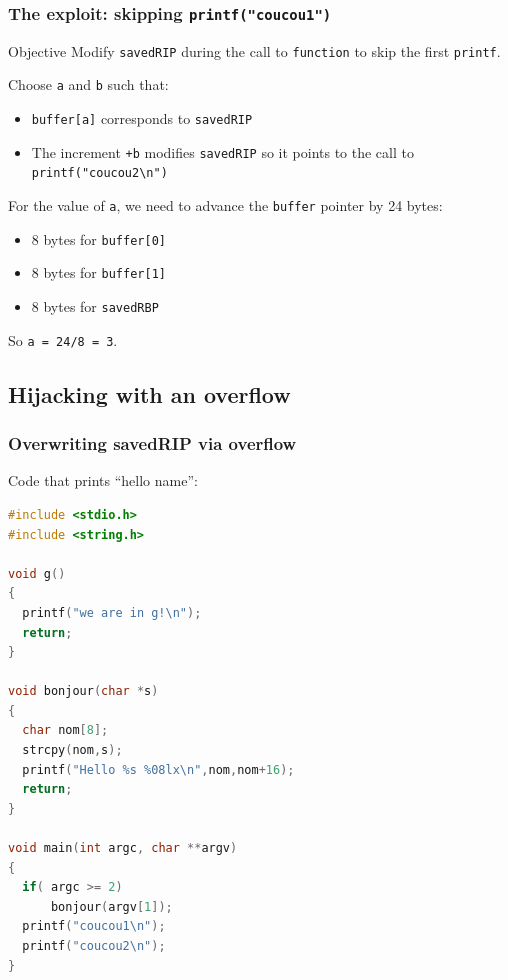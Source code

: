 \documentclass{beamer}
\begin{document}
\begin{frame}[fragile]
\frametitle{The exploit: skipping \texttt{printf("coucou1")}}

\begin{block}{Objective}
Modify \texttt{savedRIP} during the call to \texttt{function} to skip the first \texttt{printf}.
\end{block}

Choose \texttt{a} and \texttt{b} such that:
\begin{itemize}
\item \texttt{buffer[a]} corresponds to \texttt{savedRIP}
\item The increment \texttt{+b} modifies \texttt{savedRIP} so it points to the call to \texttt{printf("coucou2\textbackslash n")}
\end{itemize}

\medskip
For the value of \texttt{a}, we need to advance the \texttt{buffer} pointer by 24 bytes:
\begin{itemize}
\item 8 bytes for \texttt{buffer[0]}
\item 8 bytes for \texttt{buffer[1]}
\item 8 bytes for \texttt{savedRBP}
\end{itemize}
So \texttt{a = 24/8 = 3}.

\end{frame}


\subsection{Hijacking with an overflow}

\begin{frame}[fragile]
\frametitle{Overwriting savedRIP via overflow}

Code that prints ``hello name'':

\begin{lstlisting}[language=C]
#include <stdio.h>
#include <string.h>

void g()
{
  printf("we are in g!\n");
  return;
}

void bonjour(char *s)
{
  char nom[8];
  strcpy(nom,s);
  printf("Hello %s %08lx\n",nom,nom+16);
  return;
}

void main(int argc, char **argv)
{
  if( argc >= 2)
      bonjour(argv[1]);
  printf("coucou1\n");
  printf("coucou2\n");
}
\end{lstlisting}

\end{frame}
\end{document}
